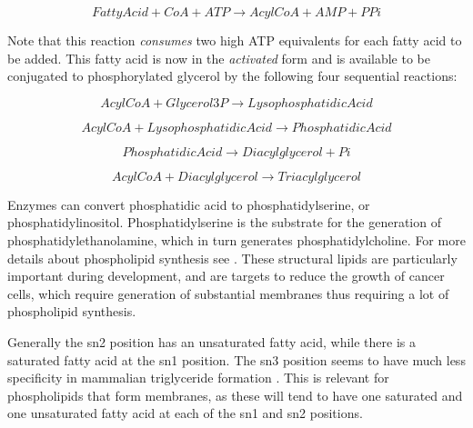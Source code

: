 \documentclass{tufte-handout}
\begin{document}
\begin{equation}
Fatty Acid + CoA +  ATP \rightarrow AcylCoA + AMP + PPi
\end{equation}

Note that this reaction \emph{consumes} two high ATP equivalents for each fatty acid to be added.  This fatty acid is now in the \emph{activated} form and is available to be conjugated to phosphorylated glycerol by the following four sequential reactions:

\begin{equation}\label{eq:gpat}
AcylCoA + Glycerol3P \rightarrow Lysophosphatidic Acid
\end{equation}

\begin{equation}\label{eq:LPAT}
AcylCoA+ Lysophosphatidic Acid \rightarrow Phosphatidic Acid
\end{equation}

\begin{equation}\label{eq:lipin}
Phosphatidic Acid \rightarrow Diacylglycerol + Pi
\end{equation}

\begin{equation}
AcylCoA + Diacylglycerol \rightarrow Triacylglycerol
\end{equation}

  Enzymes can convert phosphatidic acid to phosphatidylserine, or phosphatidylinositol.  Phosphatidylserine is the substrate for the generation of phosphatidylethanolamine, which in turn generates phosphatidylcholine.  For more details about phospholipid synthesis see \citet{Kent1995}.  These structural lipids are particularly important during development, and are targets to reduce the growth of cancer cells, which require generation of substantial membranes thus requiring a lot of phospholipid synthesis.  

  Generally the sn2 position has an unsaturated fatty acid, while there is a saturated fatty acid at the sn1 position.  The sn3 position seems to have much less specificity in mammalian triglyceride formation \citep{Brockerhoff1971}.  This is relevant for phospholipids that form membranes, as these will tend to have one saturated and one unsaturated fatty acid at each of the sn1 and sn2 positions.  
\end{document}
